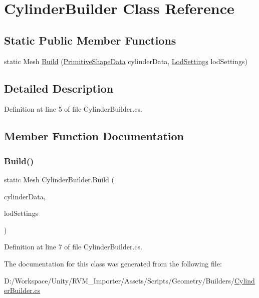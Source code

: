 \hypertarget{class_cylinder_builder}{}\section{Cylinder\+Builder Class Reference}
\label{class_cylinder_builder}
\subsection*{Static Public Member Functions}
\begin{DoxyCompactItemize}
\item 
static Mesh \mbox{\hyperlink{class_cylinder_builder_ac93fe5d5bdc4043dcfcef2bc12bb1a79}{Build}} (\mbox{\hyperlink{class_primitive_shape_data}{Primitive\+Shape\+Data}} cylinder\+Data, \mbox{\hyperlink{class_lod_settings}{Lod\+Settings}} lod\+Settings)
\end{DoxyCompactItemize}


\subsection{Detailed Description}


Definition at line 5 of file Cylinder\+Builder.\+cs.



\subsection{Member Function Documentation}
\mbox{\label{class_cylinder_builder_ac93fe5d5bdc4043dcfcef2bc12bb1a79}} 
\subsubsection{\texorpdfstring{Build()}{Build()}}
{\footnotesize\ttfamily static Mesh Cylinder\+Builder.\+Build (\begin{DoxyParamCaption}\item[{\mbox{\hyperlink{class_primitive_shape_data}{Primitive\+Shape\+Data}}}]{cylinder\+Data,  }\item[{\mbox{\hyperlink{class_lod_settings}{Lod\+Settings}}}]{lod\+Settings }\end{DoxyParamCaption})\hspace{0.3cm}{\ttfamily [static]}}



Definition at line 7 of file Cylinder\+Builder.\+cs.



The documentation for this class was generated from the following file\+:\begin{DoxyCompactItemize}
\item 
D\+:/\+Workspace/\+Unity/\+R\+V\+M\+\_\+\+Importer/\+Assets/\+Scripts/\+Geometry/\+Builders/\mbox{\hyperlink{_cylinder_builder_8cs}{Cylinder\+Builder.\+cs}}\end{DoxyCompactItemize}
